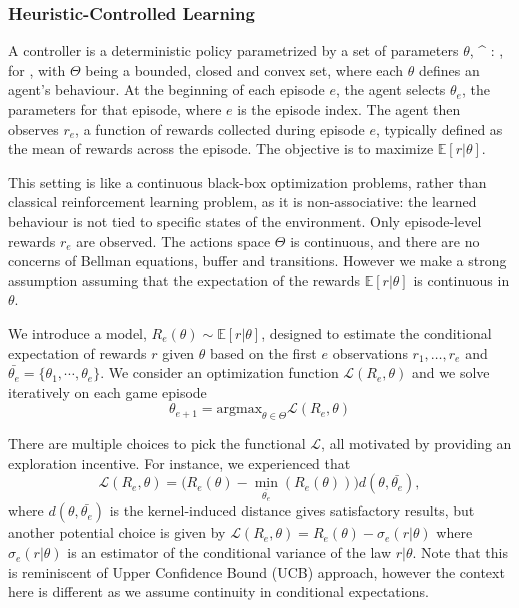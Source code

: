\documentclass[
]{article}
\def\({}%
\def\){}%
\numberwithin{equation}{section}
\begin{document}
\hypertarget{Heuristic-Controlled Learning}{%
\subsubsection{Heuristic-Controlled Learning}\label{Heuristic-Controlled Learning}}

A controller is a deterministic policy parametrized by a set of parameters $\theta$, \( ^{\theta} :  \rightarrow {} \),
for \( \theta \in \Theta \), with $\Theta$ being a bounded, closed and convex set, where each $\theta$ defines an agent's behaviour. At the beginning of each episode $e$, the agent selects $\theta_e$, the parameters for that episode, where $e$ is the episode index. The agent then observes $r_e$, a function of rewards collected during episode $e$, typically defined as the mean of rewards across the episode. The objective is to maximize $\mathbb{E}[r|\theta]$. 

This setting is like a continuous black-box optimization problems, rather than classical reinforcement learning problem, as it is non-associative:  the learned behaviour is not tied to specific states of the environment. Only episode-level rewards $r_e$ are observed. 
The actions space $\Theta$ is continuous, and there are no concerns of Bellman equations, buffer and transitions. However we make a strong assumption assuming that the expectation of the rewards $\mathbb{E}[r|\theta]$ is continuous in $\theta$.

We introduce a model, $R_e(\theta) \sim \mathbb{E}[r|\theta]$, designed to estimate  the conditional expectation of rewards $r$ given $\theta$ based on the first $e$ observations $r_1, \dots, r_e$ and $\bar{\theta_e} = \{ \theta_1, \cdots, \theta_e \}$. 
We consider an optimization function $\mathcal{L}(R_e,\theta)$ and we solve iteratively on each game episode
\begin{equation}
 \theta_{e+1} = \text{argmax}_{\theta \in \Theta} \mathcal{L}(R_e,\theta)
 \label{HCEq}
\end{equation}

There are multiple choices to pick the functional $\mathcal{L}$, all motivated by providing an exploration incentive. For instance, we experienced that
\begin{equation}\label{hc_model}
\mathcal{L}(R_e,\theta) = \big( R_e(\theta) - \min_{\bar{\theta_e}}(R_e(\theta)) \big) d(\theta, \bar{\theta_e}),
\end{equation}where $d(\theta, \bar{\theta_e})$ is the kernel-induced distance gives satisfactory results, but another potential choice is given by $\mathcal{L}(R_e,\theta) = R_e(\theta) - \sigma_e(r|\theta)$ where $\sigma_e(r|\theta)$ is an estimator of the conditional variance of the law $r|\theta$. Note that this is reminiscent of Upper Confidence Bound (UCB) approach, however the context here is different as we assume continuity in conditional expectations.
\end{document}
